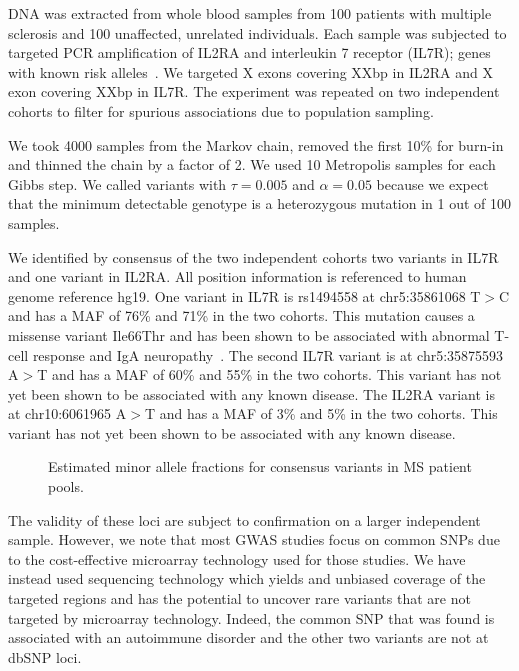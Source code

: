 \documentclass[11pt,reqno]{amsart}
\begin{document}
DNA was extracted from whole blood samples from 100 patients with multiple sclerosis and 100 unaffected, unrelated individuals. Each sample was subjected to targeted PCR amplification of IL2RA and interleukin 7 receptor (IL7R); genes with known risk alleles~\cite{HauserNEJM2007}. We targeted X exons covering XXbp in IL2RA and X exon covering XXbp in IL7R. The experiment was repeated on two independent cohorts to filter for spurious associations due to population sampling.

We took 4000 samples from the Markov chain, removed the first 10\% for burn-in and thinned the chain by a factor of 2. We used 10 Metropolis samples for each Gibbs step. We called variants with $\tau = 0.005$ and $\alpha = 0.05$ because we expect that the minimum detectable genotype is a heterozygous mutation in 1 out of 100 samples. 

We identified by consensus of the two independent cohorts two variants in IL7R and one variant in IL2RA. All position information is referenced to human genome reference hg19. One variant in IL7R is rs1494558 at chr5:35861068 T$>$C and has a MAF of 76\% and 71\% in the two cohorts. This mutation causes a missense variant Ile66Thr and has been shown to be associated with abnormal T-cell response and IgA neuropathy~\citep{Hahn:2009bi}. The second IL7R variant is at chr5:35875593 A$>$T and has a MAF of 60\% and 55\% in the two cohorts. This variant has not yet been shown to be associated with any known disease. The IL2RA variant is at chr10:6061965 A$>$T and has a MAF  of 3\% and 5\% in the two cohorts. This variant has not yet been shown to be associated with any known disease.

\begin{figure}[h]
\begin{center}
\caption{Estimated minor allele fractions for consensus variants in MS patient pools.}
\label{fig:MS_MAF}
\end{center}
\end{figure}

The validity of these loci are subject to confirmation on a larger independent sample. However, we note that most GWAS studies focus on common SNPs due to the cost-effective microarray technology used for those studies. We have instead used sequencing technology which yields and unbiased coverage of the targeted regions and has the potential to uncover rare variants that are not targeted by microarray technology. Indeed, the common SNP that was found is associated with an autoimmune disorder and the other two variants are not at dbSNP loci.
\end{document}
